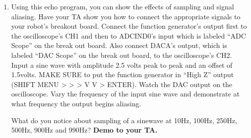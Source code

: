 \documentclass[11pt]{article}
\begin{document}
\begin{enumerate}
\begin{itemize}
                \item Set \texttt{UARTPrint = 1} every 100ms and change the code in the \texttt{main()} while loop so that your ADC voltage value is printed to the robot’s text LCD screen. Make sure to create your own \texttt{int32_t} count variable for this ADCD1 interrupt function. It is normally not a good idea to use a count variable from a different timer function.
            \item As a final step, clear the interrupt source flag and the PIE peripheral so that processor will wait for the next interrupt flag before the ADC ISR is called again.
        \end{itemize}
    \item Using this echo program, you can show the effects of sampling and signal aliasing. Have your TA show you how to connect the appropriate signals to your robot’s breakout board. Connect the function generator’s output first to the oscilloscope’s CH1 and then to ADCIND0’s input which is labeled “ADC Scope” on the break out board. Also connect DACA’s output, which is labeled “DAC Scope” on the break out board, to the oscilloscope’s CH2. Input a sine wave with amplitude 2.5 volts peak to peak and an offset of 1.5volts. MAKE SURE to put the function generator in “High Z” output (SHIFT MENU \textgreater{} \textgreater{} \textgreater{} V V \textgreater{} ENTER). Watch the DAC output on the oscilloscope. Vary the frequency of the input sine wave and demonstrate at what frequency the output begins aliasing.
        \begin{checkoff}
                What do you notice about sampling of a sinewave at 10Hz, 100Hz, 250Hz, 500Hz, 900Hz and 990Hz? \textbf{Demo to your TA.}
        \end{checkoff}
\end{enumerate}
%
\end{document}
